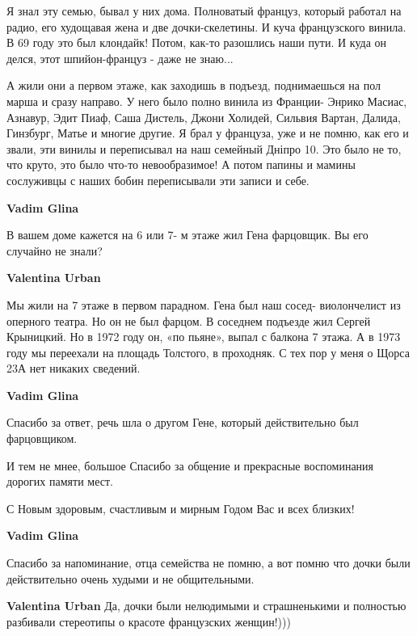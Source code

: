 \begin{itemize}

Я знал эту семью, бывал у них дома. Полноватый француз, который работал на
радио, его худощавая жена и две дочки-скелетины. И куча французского винила. В
69 году это был клондайк! Потом, как-то разошлись наши пути. И куда он делся,
этот шпийон-француз - даже не знаю...

\begin{itemize} %

А жили они а первом этаже, как заходишь в подъезд, поднимаешься на пол марша и
сразу направо. У него было полно винила из Франции- Энрико Масиас, Азнавур,
Эдит Пиаф, Саша Дистель, Джони Холидей, Сильвия Вартан, Далида, Гинзбург, Матье
и многие другие. Я брал у француза, уже и не помню, как его и звали, эти винилы
и переписывал на наш семейный Дніпро 10. Это было не то, что круто, это было
что-то невообразимое! А потом папины и мамины сослуживцы с наших бобин
переписывали эти записи и себе.

\begin{itemize} %
\textbf{Vadim Glina} 

В вашем доме кажется на 6 или 7- м этаже жил Гена фарцовщик. Вы его случайно не знали?

\textbf{Valentina Urban} 

Мы жили на 7 этаже в первом парадном. Гена был наш сосед- виолончелист из
оперного театра. Но он не был фарцом. В соседнем подъезде жил Сергей Крыницкий.
Но в 1972 году он, «по пьяне», выпал с балкона 7 этажа. А в 1973 году мы
переехали на площадь Толстого, в проходняк. С тех пор у меня о Щорса 23А нет
никаких сведений.


\textbf{Vadim Glina} 

Спасибо за ответ, речь шла о другом Гене, который действительно был
фарцовщиком.

И тем не мнее, большое Спасибо за общение и прекрасные воспоминания дорогих
памяти мест.

С Новым здоровым, счастливым и мирным Годом Вас и всех близких!
\end{itemize} %

\textbf{Vadim Glina} 

Спасибо за напоминание, отца семейства не помню, а вот помню что дочки были
действительно очень худыми и не общительными.

\begin{itemize} %
\textbf{Valentina Urban} Да, дочки были нелюдимыми и страшненькими и полностью разбивали стереотипы о красоте французских женщин!)))
\end{itemize} %


\end{itemize}
\end{itemize}
